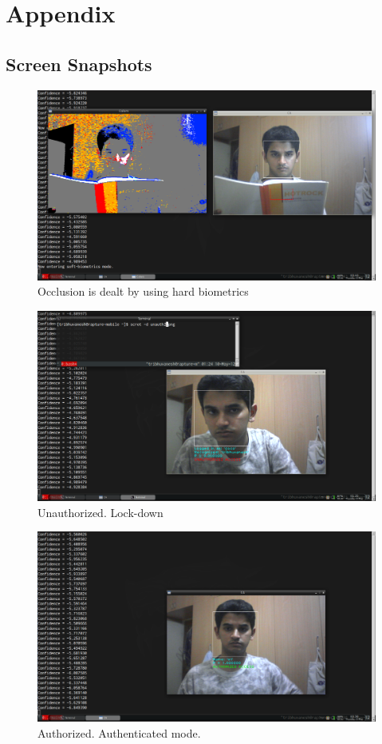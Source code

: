 \documentclass[12pt]{article}			%
\begin{document}
\section{ Appendix }
\subsection{ Screen Snapshots}
\begin{figure}
	\caption{Occlusion is dealt by using hard biometrics}
	\centering
\includegraphics[scale=0.3]{img/soft4.png}
\end{figure}

\begin{figure}
	\caption{Unauthorized. Lock-down}
	\centering
\includegraphics[scale=0.3]{img/unauth2.png}
\end{figure}

\begin{figure}
	\caption{Authorized. Authenticated mode.}
	\centering
\includegraphics[scale=0.3]{img/hard2.png}
\end{figure}
\end{document}
